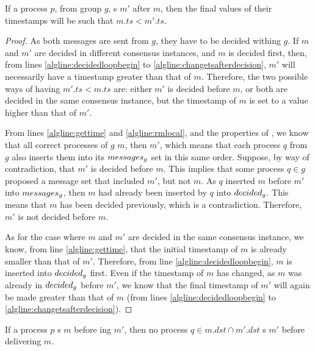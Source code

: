 \documentclass[times, 10pt]{article}
\begin{document}
\begin{lems} \label{lemma:fifofinalts}
If a process $p$, from group $g$, \amcast{}s $m'$ after $m$, then the final values of their timestamps will be such that $m.ts < m'.ts$.
\end{lems}

\begin{proof}
As both messages are sent from $g$, they have to be decided withing $g$. If $m$ and $m'$ are decided in different consensus instances, and $m$ is decided first, then, from lines \ref{algline:decidedloopbegin} to \ref{algline:changetsafterdecision}, $m'$ will necessarily have a timestamp greater than that of $m$. Therefore, the two possible ways of having $m'.ts < m.ts$ are: either $m'$ is decided before $m$, or both are decided in the same consensus instance, but the timestamp of $m$ is set to a value higher than that of $m'$.

From lines \ref{algline:gettime} and \ref{algline:rmlocal}, and the properties of \rmcast{}, we know that all correct processes of $g$ \rmdel{} $m$, then $m'$, which means that each process $q$ from $g$ also inserts them into its $messages\text{$_g$}$ set in this same order. Suppose, by way of contradiction, that $m'$ is decided before $m$. This implies that some process $q \in g$ proposed a message set that included $m'$, but not $m$. As $q$ inserted $m$ before $m'$ into $messages\text{$_g$}$, then $m$ had already been inserted by $q$ into $decided\text{$_g$}$. This means that $m$ has been decided previously, which is a contradiction. Therefore, $m'$ is not decided before $m$.

As for the case where $m$ and $m'$ are decided in the same consensus instance, we know, from line \ref{algline:gettime}, that the initial timestamp of $m$ is already smaller than that of $m'$. Therefore, from line \ref{algline:decidedloopbegin}, $m$ is inserted into $decided\text{$_g$}$ first. Even if the timestamp of $m$ has changed, as $m$ was already in $decided\text{$_g$}$ before $m'$, we know that the final timestamp of $m'$ will again be made greater than that of $m$ (from lines \ref{algline:decidedloopbegin} to \ref{algline:changetsafterdecision}).
\end{proof}






\begin{props} \label{props:fifoorder}
If a process $p$ \amcast{}s $m$ before \amcast{}ing $m'$, then no process $q \in m.dst \cap m'.dst$ \amdel{}s $m'$ before delivering $m$.
\end{props}
\end{document}
